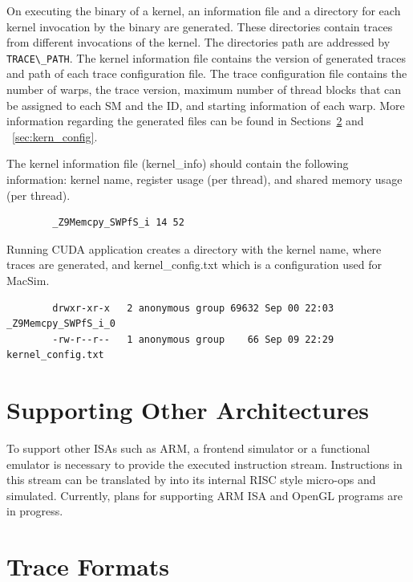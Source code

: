 On executing the binary of a kernel, an information file and a directory for each
kernel invocation by the binary are generated. These directories contain traces from 
different invocations of the kernel. The directories path are addressed by \Verb+TRACE\_PATH+. 
The kernel information file contains the version of generated traces and path of
each trace configuration file. The trace configuration file contains the number of warps, the
trace version, maximum number of thread blocks that can be assigned to each SM
and the ID, and starting information of each warp. More information regarding
the generated files can be found in Sections~\ref{sec:traceformat} and ~\ref{sec:kern_config}. 

\ignore
		{
		The kernel information file (kernel\_info) should contain the following
		information: kernel name, register usage (per thread), and shared memory usage
		(per thread).


		\begin{Verbatim}
		_Z9Memcpy_SWPfS_i 14 52 
		\end{Verbatim}


		Running CUDA application creates a directory with the kernel name, where traces 
		are generated, and kernel\_config.txt which is a configuration used for MacSim.


		\begin{Verbatim}
		drwxr-xr-x   2 anonymous group 69632 Sep 00 22:03 _Z9Memcpy_SWPfS_i_0
		-rw-r--r--   1 anonymous group    66 Sep 09 22:29 kernel_config.txt
		\end{Verbatim}
		}


\section{Supporting Other Architectures}

To support other ISAs such as ARM, a frontend simulator or a
functional emulator is necessary to provide the executed instruction stream. 
Instructions in this stream can be translated by \SIM into
its internal RISC style micro-ops and simulated. Currently, plans for
supporting ARM ISA and OpenGL programs are in progress.


\section{Trace Formats}
\label{sec:traceformat}

